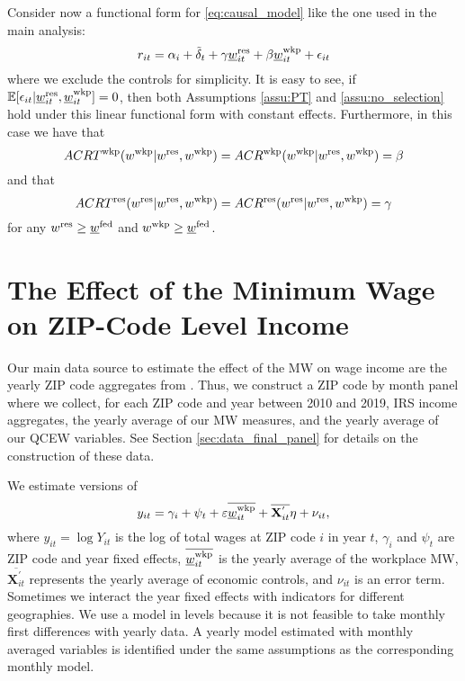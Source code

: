 Consider now a functional form for \eqref{eq:causal_model} like the one used in 
the main analysis:
$$
r_{it} = \alpha_i + \tilde\delta_t 
         + \gamma \underline{w}_{it}^{\text{res}} + \beta \underline{w}_{it}^{\text{wkp}}
         + \epsilon_{it}
$$
where we exclude the controls for simplicity.
It is easy to see, if 
$\operatorname{\mathbb{E}}[\epsilon_{it} | \underline{w}_{it}^{\text{res}}, \underline{w}_{it}^{\text{wkp}}] = 0$,
then both Assumptions \ref{assu:PT} and \ref{assu:no_selection} hold under 
this linear functional form with constant effects.
Furthermore, in this case we have that
\begin{equation*}
    ACRT^{\text{wkp}}(w^{\text{wkp}} | w^{\text{res}}, w^{\text{wkp}}) 
        = ACR^{\text{wkp}}(w^{\text{wkp}} | w^{\text{res}}, w^{\text{wkp}}) 
        = \beta
\end{equation*}
and that
\begin{equation*}
    ACRT^{\text{res}}(w^{\text{res}} | w^{\text{res}}, w^{\text{wkp}})
        = ACR^{\text{res}}(w^{\text{res}} | w^{\text{res}}, w^{\text{wkp}})
        = \gamma
\end{equation*}
for any $w^{\text{res}}\geq\underline{w}^{\text{fed}}$ and $w^{\text{wkp}}\geq\underline{w}^{\text{fed}}$.

\clearpage
\section{The Effect of the Minimum Wage on ZIP-Code Level Income}
\label{sec:mw_on_income}

Our main data source to estimate the effect of the MW on wage income are
the yearly ZIP code aggregates from \textcite{IRS}.
Thus, we construct a ZIP code by month panel where we collect, for each ZIP code
and year between 2010 and 2019, IRS income aggregates, the yearly average of our 
MW measures, and the yearly average of our QCEW variables. 
See Section \ref{sec:data_final_panel} for details on the construction of these 
data.

We estimate versions of
\begin{equation}\label{eq:wage_level_model}
    y_{it} = \gamma_i + \psi_t + \varepsilon \overline{\underline{w}_{it}^{\text{wkp}}} + 
                 \overline{\mathbf{X}^{'}_{it}}\eta + \nu_{it} ,
\end{equation}
where 
$y_{it} = \log Y_{it}$ is the log of total wages at ZIP code $i$ in year $t$,
$\gamma_i$ and $\psi_t$ are ZIP code and year fixed effects,
$\overline{\underline{w}_{it}^{\text{wkp}}}$ is the yearly average of the workplace MW,
$\overline{\mathbf{X}^{'}_{it}}$ represents the yearly average of economic 
controls, and
$\nu_{it}$ is an error term.
Sometimes we interact the year fixed effects with indicators for different
geographies.
We use a model in levels because it is not feasible to take monthly first differences 
with yearly data.
A yearly model estimated with monthly averaged variables is identified under the 
same assumptions as the corresponding monthly model.

